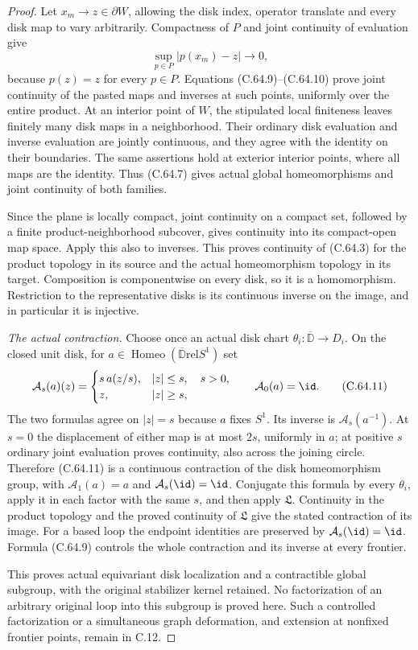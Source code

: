 \begin{proof}
Let $x_m\to z\in\partial W$, allowing the disk index,
operator translate and every disk map to vary arbitrarily.
Compactness of $P$ and joint continuity of evaluation give
\[
             \sup_{p\in P}|p(x_m)-z|\longrightarrow0,    \tag{C.64.10}
\]
because $p(z)=z$ for every $p\in P$. Equations
(C.64.9)--(C.64.10) prove joint continuity of the pasted
maps and inverses at such points, uniformly over the
entire product. At an interior point of $W$, the stipulated
local finiteness leaves finitely many disk maps in a
neighborhood. Their ordinary disk evaluation and inverse
evaluation are jointly continuous, and they agree with
the identity on their boundaries. The same assertions hold
at exterior interior points, where all maps are the identity.
Thus (C.64.7) gives actual global homeomorphisms and joint
continuity of both families.

Since the plane is locally compact, joint continuity on a
compact set, followed by a finite product-neighborhood
subcover, gives continuity into its compact-open map space.
Apply this also to inverses. This proves continuity of
(C.64.3) for the product topology in its source and the
actual homeomorphism topology in its target. Composition
is componentwise on every disk, so it is a homomorphism.
Restriction to the representative disks is its continuous
inverse on the image, and in particular it is injective.

\emph{The actual contraction.}
Choose once an actual disk chart
$\theta_i:\overline{\mathbb D}\to D_i$. On the closed unit
disk, for $a\in\operatorname{Homeo}(\overline{\mathbb D}
\mathbin{\mathrm{rel}}S^1)$ set
\[
 \mathcal A_s(a)(z)=
 \begin{cases}
 s\,a(z/s),& |z|\leq s,\quad s>0,\\
 z,& |z|\geq s,
 \end{cases}
 \qquad \mathcal A_0(a)=\id.                            \tag{C.64.11}
\]
The two formulas agree on $|z|=s$ because $a$ fixes $S^1$.
Its inverse is $\mathcal A_s(a^{-1})$. At $s=0$ the
displacement of either map is at most $2s$, uniformly in
$a$; at positive $s$ ordinary joint evaluation proves
continuity, also across the joining circle. Therefore
(C.64.11) is a continuous contraction of the disk
homeomorphism group, with $\mathcal A_1(a)=a$ and
$\mathcal A_s(\id)=\id$.
Conjugate this formula by every $\theta_i$, apply it in
each factor with the same $s$, and then apply $\mathfrak L$.
Continuity in the product topology and the proved continuity
of $\mathfrak L$ give the stated contraction of its image.
For a based loop the endpoint identities are preserved by
$\mathcal A_s(\id)=\id$. Formula (C.64.9) controls the
whole contraction and its inverse at every frontier.

This proves actual equivariant disk localization and a
contractible global subgroup, with the original stabilizer
kernel retained. No factorization of an arbitrary original
loop into this subgroup is proved here. Such a controlled
factorization or a simultaneous graph deformation, and
extension at nonfixed frontier points, remain in C.12.
\end{proof}
